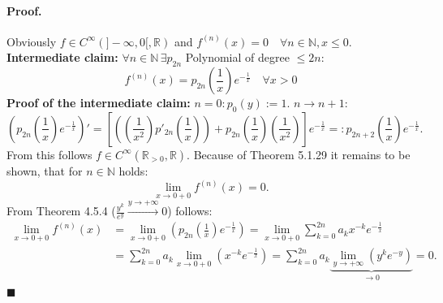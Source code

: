 \documentclass[12pt]{article}
\newcommand{\N}{\mathbb{N}}
\newcommand{\R}{\mathbb{R}}
\begin{document}
\paragraph*{Proof.} Obviously $f \in C^\infty(]-\infty, 0[, \R)$ and $f^{(n)}(x) = 0 \quad \forall n \in \N, x \le 0$. \\
\textbf{Intermediate claim:} $\forall n \in \N \, \exists p_{2n}$ Polynomial of degree $\le 2n$:
\[
f^{(n)}(x) = p_{2n}\left(\frac{1}{x}\right) e^{-\frac{1}{x}} \quad \forall x > 0
\]
\textbf{Proof of the intermediate claim:} $n=0: p_0(y) := 1$. \quad $n \to n+1$:
\[
\left( p_{2n}\left(\frac{1}{x}\right) e^{-\frac{1}{x}} \right)' = \left[ \left( \left(\frac{1}{x^2}\right) p'_{2n}\left(\frac{1}{x}\right) \right) + p_{2n}\left(\frac{1}{x}\right) \left(\frac{1}{x^2}\right) \right] e^{-\frac{1}{x}} =: p_{2n+2}\left(\frac{1}{x}\right) e^{-\frac{1}{x}}.
\]
From this follows $f \in C^\infty(\R_{>0}, \R)$. Because of Theorem 5.1.29 it remains to be shown, that for $n \in \N$ holds:
\[
\lim_{x \to 0+0} f^{(n)}(x) = 0.
\]
From Theorem 4.5.4 ($\frac{y^k}{e^y} \xrightarrow{y \to +\infty} 0$) follows:
\begin{align*}
\lim_{x \to 0+0} f^{(n)}(x) &= \lim_{x \to 0+0} \left( p_{2n}\left(\frac{1}{x}\right) e^{-\frac{1}{x}} \right) = \lim_{x \to 0+0} \sum_{k=0}^{2n} a_k x^{-k} e^{-\frac{1}{x}} \\
&= \sum_{k=0}^{2n} a_k \lim_{x \to 0+0} (x^{-k} e^{-\frac{1}{x}}) = \sum_{k=0}^{2n} a_k \underbrace{\lim_{y \to +\infty} (y^k e^{-y})}_{\to 0} = 0.
\end{align*}
\hfill $\blacksquare$
\end{document}
